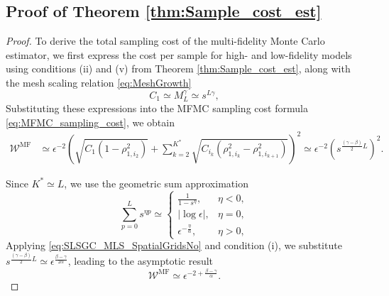 \subsection{Proof of Theorem \ref{thm:Sample_cost_est}}
\begin{proof}\label{eq:Sample_cost_est}
To derive the total sampling cost of the multi-fidelity Monte Carlo estimator, we first express the cost per sample for high- and low-fidelity models using conditions (ii) and (v) from Theorem \ref{thm:Sample_cost_est}, along with the mesh scaling relation \eqref{eq:MeshGrowth}
%
\[
C_1\simeq M_L^\gamma \simeq s^{L\gamma},
\]
%
Substituting these expressions into the MFMC sampling cost formula \eqref{eq:MFMC_sampling_cost}, we obtain
%
\begin{align*}
    \mathcal{W}^\text{MF} &\simeq \epsilon^{-2}\left(\sqrt{C_1\left(1 - \rho_{1,i_2}^2\right)}+\sum_{k=2}^{K^*} \sqrt{C_{i_k}\left(\rho_{1,{i_k}}^2 - \rho_{1,i_{k+1}}^2\right)} \right)^2 \simeq \epsilon^{-2}\left(s^{\frac{(\gamma-\beta)}{2}L}\right)^2.
\end{align*}

Since $K^*\simeq L$, we use the geometric sum approximation
%
\begin{equation}
\label{eq:Geo_sum_for_s}
\sum_{p=0}^L s^{\eta p}\simeq\left\{\begin{array}{ll}
\frac{1}{1-s^{\eta}}, & \eta<0,\\
|\log \epsilon|, & \eta = 0,\\
\epsilon^{-\frac{\eta}{\alpha}}, & \eta>0,
\end{array}
\right.
\end{equation}
%
Applying \eqref{eq:SLSGC_MLS_SpatialGridsNo} and condition (i), we substitute $s^{\frac{(\gamma-\beta)}{2}L}\simeq \epsilon^{\frac{\beta-\gamma}{2\alpha}}$, leading to the asymptotic result
\[
\mathcal{W}^\text{MF} \simeq \epsilon^{-2+\frac{\beta-\gamma}{\alpha}}.
\]
\end{proof}



